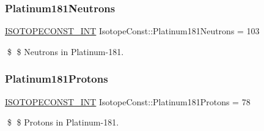 \subsubsection{\texorpdfstring{Platinum181\+Neutrons}{Platinum181Neutrons}}
{\footnotesize\ttfamily \mbox{\hyperlink{group___isotope_const-_macros_ga5f18360b3e99483a35c32d789e62621c}{I\+S\+O\+T\+O\+P\+E\+C\+O\+N\+S\+T\+\_\+\+I\+NT}} Isotope\+Const\+::\+Platinum181\+Neutrons = 103}

\$ \$ Neutrons in Platinum-\/181. \mbox{\label{group___isotope_const-_platinum-_pt181_ga30e24db0ff72d58ebbc9c6cac22b9314}} 
\subsubsection{\texorpdfstring{Platinum181\+Protons}{Platinum181Protons}}
{\footnotesize\ttfamily \mbox{\hyperlink{group___isotope_const-_macros_ga5f18360b3e99483a35c32d789e62621c}{I\+S\+O\+T\+O\+P\+E\+C\+O\+N\+S\+T\+\_\+\+I\+NT}} Isotope\+Const\+::\+Platinum181\+Protons = 78}

\$ \$ Protons in Platinum-\/181. 
